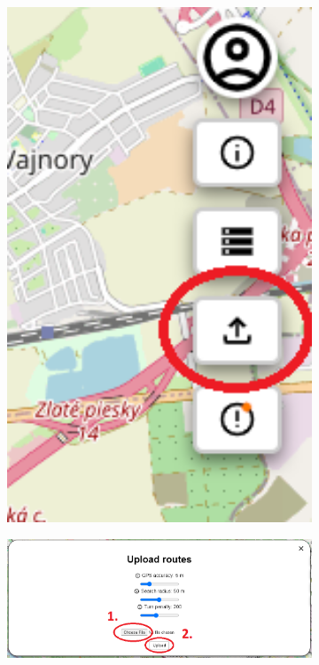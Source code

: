 \begin{figure}[H]
    \centering
    \begin{subfigure}{0.2\textwidth}
        \centering
        \includegraphics[width=1\textwidth]{guide_includes/img/upload_file_tool_button.png}
    \end{subfigure}
    \begin{subfigure}{0.78\textwidth}
        \centering
        \includegraphics[width=1\textwidth]{guide_includes/img/upload_file.png}
    \end{subfigure}
\end{figure}


